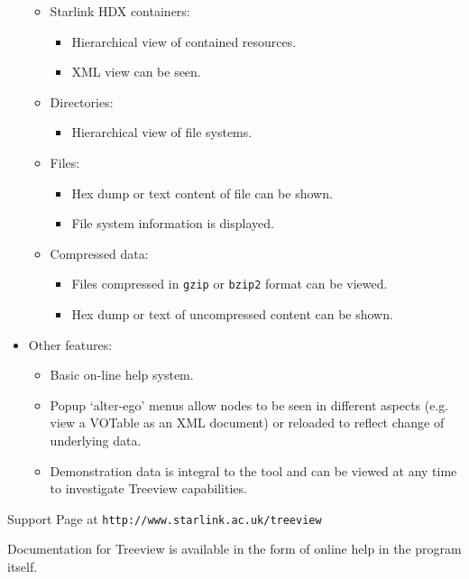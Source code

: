 \documentclass[twoside,11pt]{article}
\newcommand{\htmladdnormallink}[2]{#1}
\newcommand{\latex}[1]{#1}
\renewcommand{\_}{\texttt{\symbol{95}}}
\begin{document}
\begin{itemize}
\begin{itemize}
\item Starlink HDX containers:
\begin{itemize}
 \item Hierarchical view of contained resources.
 \item XML view can be seen. 
\end{itemize}

\item Directories:
\begin{itemize}
 \item Hierarchical view of file systems. 
\end{itemize}

\item Files:
\begin{itemize}
 \item Hex dump or text content of file can be shown.
 \item File system information is displayed. 
\end{itemize}

\item  Compressed data:
\begin{itemize}
 \item Files compressed in \texttt{gzip} or \texttt{bzip2} format can be viewed.
 \item Hex dump or text of uncompressed content can be shown. 
\end{itemize}
\end{itemize}

\item Other features:
\begin{itemize}
 \item Basic on-line help system.
 \item Popup `alter-ego' menus allow nodes to be seen in different aspects 
      (e.g. view a VOTable as an XML document) or reloaded to reflect change of 
      underlying data.
 \item Demonstration data is integral to the tool and can be viewed at any time to 
       investigate Treeview capabilities. 
\end{itemize}      
\end{itemize}

Support Page at 
\htmladdnormallink{\texttt{http://www.starlink.ac.uk/treeview}}{http://www.starlink.ac.uk/treeview}

Documentation for Treeview is available in the form of online help 
in the program itself.
\end{document}
